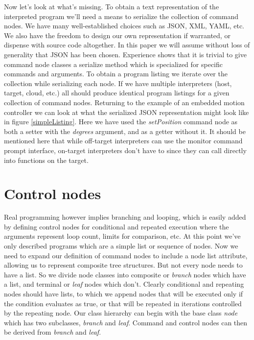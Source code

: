 \documentclass[a4paper,10pt]{article}
\begin{document}
Now let's look at what's missing. To obtain a text representation of the interpreted program we'll need a means to serialize the collection of command nodes. We have many well-established choices such as JSON, XML, YAML, etc. We also have the freedom to design our own representation if warranted, or dispense with source code altogether. In this paper we will assume without loss of generality that JSON has been chosen. Experience shows that it is trivial to give command node classes a serialize method which is specialized for specific commands and arguments. To obtain a program listing we iterate over the collection while serializing each node. If we have multiple interpreters (host, target, cloud, etc.) all should produce identical program listings for a given collection of command nodes. Returning to the example of an embedded motion controller we can look at what the serialized JSON representation might look like in figure \ref{simpleListing}. Here we have used the \textit{setPosition} command node as both a setter with the \textit{degrees} argument, and as a getter without it. It should be mentioned here that while off-target interpreters can use the monitor command prompt interface, on-target interpreters don't have to since they can call directly into functions on the target.

\section{Control nodes}

Real programming however implies branching and looping, which is easily added by defining control nodes for conditional and repeated execution where the arguments represent loop count, limits for comparison, etc. At this point we've only described programs which are a simple list or sequence of nodes. Now we need to expand our definition of command nodes to include a node list attribute, allowing us to represent composite tree structures. But not every node needs to have a list. So we divide node classes into composite or \textit{branch} nodes which have a list, and terminal or \textit{leaf} nodes which don't. Clearly conditional and repeating nodes should have lists, to which we append nodes that will be executed only if the condition evaluates as true, or that will be repeated in iterations controlled by the repeating node. Our class hierarchy can begin with the base class \textit{node} which has two subclasses, \textit{branch} and \textit{leaf}. Command and control nodes can then be derived from \textit{branch} and \textit{leaf}. 
\end{document}
